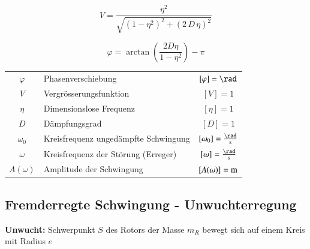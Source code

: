 \begin{minipage}{0.48\linewidth}
$$ \boxed{ V = \frac{\eta^2}{\sqrt{(1- \eta^2)^2 + (2 \, D \, \eta)^2} } } $$
\end{minipage}
\hfill
\begin{minipage}{0.48\linewidth}
$$ \boxed{ \varphi = \arctan \left( \frac{2 D \eta}{1 - \eta^2} \right) - \pi } $$ 
\end{minipage}

\vspace{0.2cm}

\begin{tabular}{c l c}
$\varphi$ & Phasenverschiebung & $[ \varphi] = \rad$ \\
$V$ & Vergrösserungsfunktion & $[V] = 1$ \\
$\eta$ & Dimensionslose Frequenz & $[\eta] = 1$  \\
$D$ & Dämpfungsgrad & $[D] = 1$  \\
\rule{0pt}{10pt} $\omega_0$ & Kreisfrequenz ungedämpfte Schwingung & $[\omega_0] = \frac{\rad}{\s}$ \\
\rule{0pt}{10pt} $\omega$ & Kreisfrequenz der Störung (Erreger) & $[\omega] = \frac{\rad}{\s}$ \\
$A(\omega)$ & Amplitude der Schwingung & $[A(\omega)] = \mathrm{m}$
\end{tabular}



\subsection{Fremderregte Schwingung - Unwuchterregung}
\textbf{Unwucht:} Schwerpunkt $S$ des Rotors der Masse $m_R$ bewegt sich auf einem Kreis mit Radius $e$ \\

